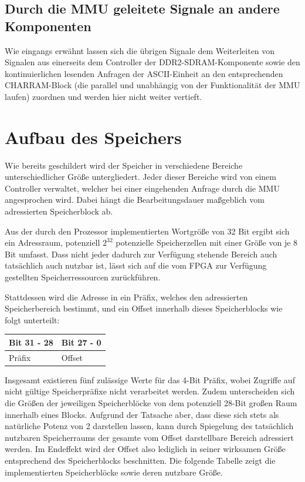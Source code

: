 \subsection{Durch die MMU geleitete Signale an andere Komponenten}

Wie eingangs erw\"ahnt lassen sich die \"ubrigen Signale dem Weiterleiten von Signalen aus einerseits dem Controller der DDR2-SDRAM-Komponente sowie den kontinuierlichen lesenden Anfragen der ASCII-Einheit an den entsprechenden CHARRAM-Block (die parallel und unabh\"angig von der Funktionalit\"at der MMU laufen) zuordnen und werden hier nicht weiter vertieft.

\section{Aufbau des Speichers}

Wie bereits geschildert wird der Speicher in verschiedene Bereiche unterschiedlicher Gr\"o\ss{}e untergliedert. Jeder dieser Bereiche wird von einem Controller verwaltet, welcher bei einer eingehenden Anfrage durch die MMU angesprochen wird. Dabei h\"angt die Bearbeitungsdauer ma\ss{}geblich vom adressierten Speicherblock ab.

Aus der durch den Prozessor implementierten Wortgr\"o\ss{}e von 32 Bit ergibt sich ein Adressraum, potenziell $2^{32}$ potenzielle Speicherzellen mit einer Gr\"o\ss{}e von je 8 Bit umfasst. Dass nicht jeder dadurch zur Verf\"ugung stehende Bereich auch tats\"achlich auch nutzbar ist, l\"asst sich auf die vom FPGA zur Verf\"ugung gestellten Speicherressourcen zur\"uckf\"uhren.

Stattdessen wird die Adresse in ein Pr\"afix, welches den adressierten Speicherbereich bestimmt, und ein Offset innerhalb dieses Speicherblocks wie folgt unterteilt:

\begin{center}
	\begin{tabular}{| l | l |}
		\hline
		Bit 31 - 28 & Bit 27 - 0 \\ \hline
		Pr\"afix & Offset \\ \hline
	\end{tabular}
\end{center}

Insgesamt existieren f\"unf zul\"assige Werte f\"ur das 4-Bit Pr\"afix, wobei Zugriffe auf nicht g\"ultige Speicherpr\"afixe nicht verarbeitet werden. Zudem unterscheiden sich die Gr\"o\ss{}en der jeweiligen Speicherbl\"ocke von dem potenziell 28-Bit gro\ss{}en Raum innerhalb eines Blocks. Aufgrund der Tatsache aber, dass diese sich stets als nat\"urliche Potenz von 2 darstellen lassen, kann durch Spiegelung des tats\"achlich nutzbaren Speicherraums der gesamte vom Offset darstellbare Bereich adressiert werden. Im Endeffekt wird der Offset also lediglich in seiner wirksamen Gr\"o\ss{}e entsprechend des Speicherblocks beschnitten. Die folgende Tabelle zeigt die implementierten Speicherbl\"ocke sowie deren nutzbare Gr\"o\ss{}e.

